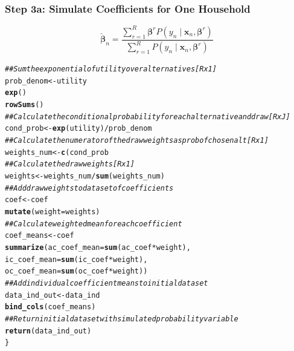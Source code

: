 \documentclass{beamer}\usepackage[]{graphicx}\usepackage[]{color}
\makeatletter
\newcommand{\hlcom}[1]{\textcolor[rgb]{0.678,0.584,0.686}{\textit{#1}}}%
\newcommand{\hlopt}[1]{\textcolor[rgb]{0,0,0}{#1}}%
\newcommand{\hlstd}[1]{\textcolor[rgb]{0.345,0.345,0.345}{#1}}%
\newcommand{\hlkwb}[1]{\textcolor[rgb]{0.69,0.353,0.396}{#1}}%
\newcommand{\hlkwc}[1]{\textcolor[rgb]{0.333,0.667,0.333}{#1}}%
\newcommand{\hlkwd}[1]{\textcolor[rgb]{0.737,0.353,0.396}{\textbf{#1}}}%
\newenvironment{kframe}{%
 \def\at@end@of@kframe{}%
 \ifinner\ifhmode%
  \def\at@end@of@kframe{\end{minipage}}%
  \begin{minipage}{\columnwidth}%
 \fi\fi%
 \def\FrameCommand##1{\hskip\@totalleftmargin \hskip-\fboxsep
 \colorbox{shadecolor}{##1}\hskip-\fboxsep
     \hskip-\linewidth \hskip-\@totalleftmargin \hskip\columnwidth}%
 \MakeFramed {\advance\hsize-\width
   \@totalleftmargin\z@ \linewidth\hsize
   \@setminipage}}%
 {\par\unskip\endMakeFramed%
 \at@end@of@kframe}
\newenvironment{knitrout}{}{} %
\makeatother
\begin{document}

\begin{frame}[fragile]\frametitle{Step 3a: Simulate Coefficients for One Household}
    $$\check{\bm{\beta}}_n = \frac{\sum_{r = 1}^R \bm{\beta}^r P(y_n \mid \bm{x}_n, \bm{\beta}^r)}{\sum_{r = 1}^R P(y_n \mid \bm{x}_n, \bm{\beta}^r)}$$
\begin{knitrout}\tiny
{}\color{fgcolor}\begin{kframe}
\begin{alltt}
\hlcom{  ## Sum the exponential of utility over alternatives [R x 1]}
  prob_denom <- utility %
    \hlkwd{exp}() %
    \hlkwd{rowSums}()
\hlcom{  ## Calculate the conditional probability for each alternative and draw [R x J]}
  cond_prob <- \hlkwd{exp}(utility) / prob_denom
\hlcom{  ## Calculate the numerator of the draw weights as prob of chosen alt [R x 1]}
  weights_num <- \hlkwd{c}(cond_prob %
\hlcom{  ## Calculate the draw weights [R x 1]}
  weights <- weights_num / \hlkwd{sum}(weights_num)
\hlcom{  ## Add draw weights to dataset of coefficients}
  coef <- coef %
    \hlkwd{mutate}(weight = weights)
\hlcom{  ## Calculate weighted mean for each coefficient}
  coef_means <- coef %
    \hlkwd{summarize}(ac_coef_mean = \hlkwd{sum}(ac_coef * weight),
              ic_coef_mean = \hlkwd{sum}(ic_coef * weight),
              oc_coef_mean = \hlkwd{sum}(oc_coef * weight))
\hlcom{  ## Add individual coefficient means to initial dataset}
  data_ind_out <- data_ind %
    \hlkwd{bind_cols}(coef_means)
\hlcom{  ## Return initial dataset with simulated probability variable}
  \hlkwd{return}(data_ind_out)
\}
\end{alltt}
\end{kframe}
\end{knitrout}
\end{frame}
\end{document}
